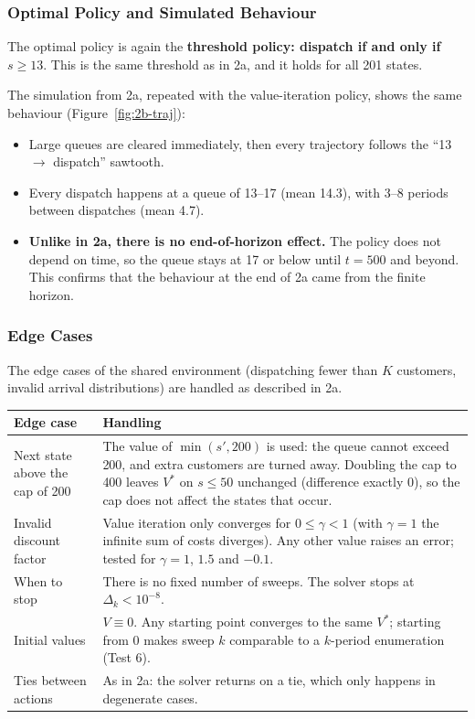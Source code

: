 \subsubsection{Optimal Policy and Simulated Behaviour}

The optimal policy is again the \textbf{threshold policy: dispatch if and only if $s \geq 13$}. This is the same threshold as in 2a, and it holds for all 201 states.


The simulation from 2a, repeated with the value-iteration policy, shows the same behaviour (Figure~\ref{fig:2b-traj}):
\begin{itemize}
  \item Large queues are cleared immediately, then every trajectory follows the ``13 $\to$ dispatch'' sawtooth.
  \item Every dispatch happens at a queue of 13--17 (mean 14.3), with 3--8 periods between dispatches (mean 4.7).
  \item \textbf{Unlike in 2a, there is no end-of-horizon effect.} The policy does not depend on time, so the queue stays at 17 or below until $t = 500$ and beyond. This confirms that the behaviour at the end of 2a came from the finite horizon.
\end{itemize}

\subsubsection{Edge Cases}

The edge cases of the shared environment (dispatching fewer than $K$ customers, invalid arrival distributions) are handled as described in 2a.

\begin{center}
\small
\begin{tabularx}{\textwidth}{@{}p{3.6cm}L@{}}
  \toprule
  \textbf{Edge case} & \textbf{Handling} \\
  \midrule
  Next state above the cap of 200 & The value of $\min(s', 200)$ is used: the queue cannot exceed 200, and extra customers are turned away. Doubling the cap to 400 leaves $V^*$ on $s \leq 50$ unchanged (difference exactly 0), so the cap does not affect the states that occur. \\
  Invalid discount factor & Value iteration only converges for $0 \leq \gamma < 1$ (with $\gamma = 1$ the infinite sum of costs diverges). Any other value raises an error; tested for $\gamma = 1$, $1.5$ and $-0.1$. \\
  When to stop & There is no fixed number of sweeps. The solver stops at $\Delta_k < 10^{-8}$. \\
  Initial values & $V \equiv 0$. Any starting point converges to the same $V^*$; starting from 0 makes sweep $k$ comparable to a $k$-period enumeration (Test 6). \\
  Ties between actions & As in 2a: the solver returns  on a tie, which only happens in degenerate cases. \\
  \bottomrule
\end{tabularx}
\end{center}

